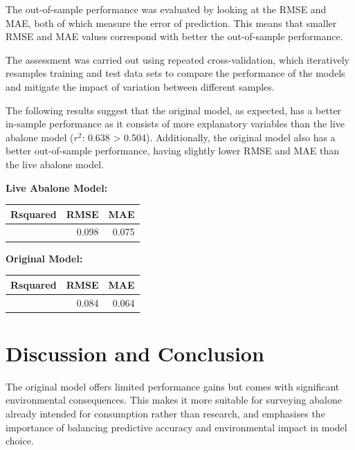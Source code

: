 \documentclass[a4paper,9pt,twocolumn,twoside,]{pinp}
\begin{document}
The out-of-sample performance was evaluated by looking at the RMSE and
MAE, both of which measure the error of prediction. This means that
smaller RMSE and MAE values correspond with better the out-of-sample
performance.

The assessment was carried out using repeated cross-validation, which
iteratively resamples training and test data sets to compare the
performance of the models and mitigate the impact of variation between
different samples.

The following results suggest that the original model, as expected, has
a better in-sample performance as it consists of more explanatory
variables than the live abalone model (\(r^2\): 0.638 \textgreater{}
0.504). Additionally, the original model also has a better out-of-sample
performance, having slightly lower RMSE and MAE than the live abalone
model.

\hfill\break
\textbf{Live Abalone Model: }\\

\begin{longtable}[]{@{}rrr@{}}
\toprule\noalign{}
Rsquared & RMSE & MAE \\
\midrule\noalign{}
\endhead
\bottomrule\noalign{}
\endlastfoot
0.504 & 0.098 & 0.075 \\
\end{longtable}

\hfill\break
\textbf{Original Model: }\\

\begin{longtable}[]{@{}rrr@{}}
\toprule\noalign{}
Rsquared & RMSE & MAE \\
\midrule\noalign{}
\endhead
\bottomrule\noalign{}
\endlastfoot
0.638 & 0.084 & 0.064 \\
\end{longtable}

\hypertarget{discussion-and-conclusion}{%
\section{Discussion and Conclusion}\label{discussion-and-conclusion}}

The original model offers limited performance gains but comes with
significant environmental consequences. This makes it more suitable for
surveying abalone already intended for consumption rather than research,
and emphasises the importance of balancing predictive accuracy and
environmental impact in model choice.
\end{document}
